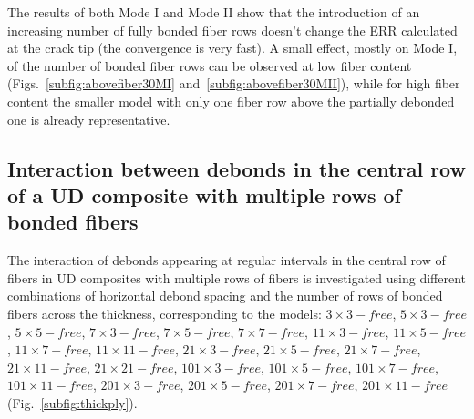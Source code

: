 \documentclass[review]{elsarticle}
\begin{document}
The results of both Mode I and Mode II show that the introduction of an increasing number of fully bonded fiber rows doesn't change the ERR calculated at the crack tip (the convergence is very fast). A small effect, mostly on Mode I, of the number of bonded fiber rows can be observed at low fiber content (Figs.~\ref{subfig:abovefiber30MI} and~\ref{subfig:abovefiber30MII}), while for high fiber content the smaller model with only one fiber row above the partially debonded one is already representative.

\subsection{Interaction between debonds in the central row of a UD composite with multiple rows of bonded fibers}\label{subsec:multrow}

The interaction of debonds appearing at regular intervals in the central row of fibers in UD composites with multiple rows of fibers is investigated using different combinations of horizontal debond spacing and the number of rows of bonded fibers across the thickness, corresponding to the models: $3\times 3-free$, $5\times 3-free$, $5\times 5-free$, $7\times 3-free$, $7\times 5-free$, $7\times 7-free$, $11\times 3-free$, $11\times 5-free$, $11\times 7-free$, $11\times 11-free$, $21\times 3-free$, $21\times 5-free$, $21\times 7-free$, $21\times 11-free$, $21\times 21-free$, $101\times 3-free$, $101\times 5-free$, $101\times 7-free$, $101\times 11-free$, $201\times 3-free$, $201\times 5-free$, $201\times 7-free$, $201\times 11-free$  (Fig.~\ref{subfig:thickply}).
\end{document}
